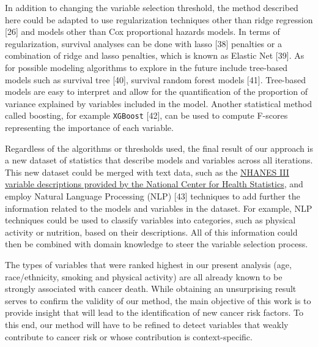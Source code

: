 \documentclass[12pt,oneside]{reedthesis}
\theoremstyle{definition}
\theoremstyle{definition}
\theoremstyle{definition}
\theoremstyle{remark}
\begin{document}
In addition to changing the variable selection threshold, the method
described here could be adapted to use regularization techniques other
than ridge regression {[}26{]} and models other than Cox proportional
hazards models. In terms of regularization, survival analyses can be
done with lasso {[}38{]} penalties or a combination of ridge and lasso
penalties, which is known as Elastic Net {[}39{]}. As for possible
modeling algorithms to explore in the future include tree-based models
such as survival tree {[}40{]}, survival random forest models {[}41{]}.
Tree-based models are easy to interpret and allow for the quantification
of the proportion of variance explained by variables included in the
model. Another statistical method called boosting, for example
\texttt{XGBoost} {[}42{]}, can be used to compute F-scores representing
the importance of each variable.

Regardless of the algorithms or thresholds used, the final result of our
approach is a new dataset of statistics that describe models and
variables across all iterations. This new dataset could be merged with
text data, such as the
\href{https://wwwn.cdc.gov/nchs/nhanes/nhanes3/DataFiles.aspx}{NHANES
III variable descriptions provided by the National Center for Health
Statistics}, and employ Natural Language Processing (NLP) {[}43{]}
techniques to add further the information related to the models and
variables in the dataset. For example, NLP techniques could be used to
classify variables into categories, such as physical activity or
nutrition, based on their descriptions. All of this information could
then be combined with domain knowledge to steer the variable selection
process.

The types of variables that were ranked highest in our present analysis
(age, race/ethnicity, smoking and physical activity) are all already
known to be strongly associated with cancer death. While obtaining an
unsurprising result serves to confirm the validity of our method, the
main objective of this work is to provide insight that will lead to the
identification of new cancer risk factors. To this end, our method will
have to be refined to detect variables that weakly contribute to cancer
risk or whose contribution is context-specific.
\end{document}
